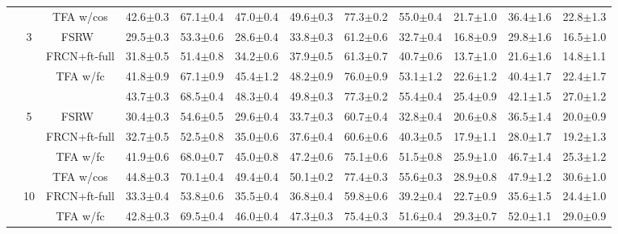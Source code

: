\documentclass{article}
\newcommand{\model}{TFA\xspace}
\begin{document}
\begin{table*}[!h]
{\begin{tabular}{c|c|c|ccc|ccc|ccc}
    & &\cellcolor{Gray} {\model w/cos} & \cellcolor{Gray}42.6$\pm$0.3 & \cellcolor{Gray} 67.1$\pm$0.4 & \cellcolor{Gray}47.0$\pm$0.4 &\cellcolor{Gray} 49.6$\pm$0.3 & \cellcolor{Gray}77.3$\pm$0.2 & \cellcolor{Gray}55.0$\pm$0.4 & \cellcolor{Gray}21.7$\pm$1.0 & \cellcolor{Gray}36.4$\pm$1.6 & \cellcolor{Gray}22.8$\pm$1.3  \\ \cmidrule{2-12}
    & \multirow{4}{*}{3} & FSRW~\cite{kang2019few} & 29.5$\pm$0.3&53.3$\pm$0.6&28.6$\pm$0.4&33.8$\pm$0.3&61.2$\pm$0.6&32.7$\pm$0.4&16.8$\pm$0.9&29.8$\pm$1.6&16.5$\pm$1.0 \\
    & & FRCN+ft-full & 31.8$\pm$0.5 & 51.4$\pm$0.8 & 34.2$\pm$0.6 & 37.9$\pm$0.5 & 61.3$\pm$0.7 & 40.7$\pm$0.6 & 13.7$\pm$1.0 & 21.6$\pm$1.6 & 14.8$\pm$1.1 \\
    & & {\model w/fc} & 41.8$\pm$0.9 & 67.1$\pm$0.9 & 45.4$\pm$1.2 & 48.2$\pm$0.9 & 76.0$\pm$0.9 & 53.1$\pm$1.2 & 22.6$\pm$1.2 & 40.4$\pm$1.7 & 22.4$\pm$1.7  \\
    & & \cellcolor{Gray}{\model w/cos} &\cellcolor{Gray} 43.7$\pm$0.3 &\cellcolor{Gray} 68.5$\pm$0.4 & \cellcolor{Gray}48.3$\pm$0.4 & \cellcolor{Gray}49.8$\pm$0.3 & \cellcolor{Gray}77.3$\pm$0.2 & \cellcolor{Gray}55.4$\pm$0.4 & \cellcolor{Gray}25.4$\pm$0.9 & \cellcolor{Gray}42.1$\pm$1.5 & \cellcolor{Gray}27.0$\pm$1.2  \\ \cmidrule{2-12}
    & \multirow{4}{*}{5} & FSRW~\cite{kang2019few} & 30.4$\pm$0.3&54.6$\pm$0.5&29.6$\pm$0.4&33.7$\pm$0.3&60.7$\pm$0.4&32.8$\pm$0.4&20.6$\pm$0.8&36.5$\pm$1.4&20.0$\pm$0.9 \\
    & & FRCN+ft-full & 32.7$\pm$0.5 & 52.5$\pm$0.8 & 35.0$\pm$0.6 & 37.6$\pm$0.4 & 60.6$\pm$0.6 & 40.3$\pm$0.5 & 17.9$\pm$1.1 & 28.0$\pm$1.7 & 19.2$\pm$1.3 \\
    & & {\model w/fc} & 41.9$\pm$0.6 & 68.0$\pm$0.7 & 45.0$\pm$0.8 & 47.2$\pm$0.6 & 75.1$\pm$0.6 & 51.5$\pm$0.8 & 25.9$\pm$1.0 & 46.7$\pm$1.4 & 25.3$\pm$1.2  \\
    & &\cellcolor{Gray} {\model w/cos} &\cellcolor{Gray} 44.8$\pm$0.3 & \cellcolor{Gray}70.1$\pm$0.4 &\cellcolor{Gray} 49.4$\pm$0.4 &\cellcolor{Gray} 50.1$\pm$0.2 &\cellcolor{Gray} 77.4$\pm$0.3 &\cellcolor{Gray} 55.6$\pm$0.3 &\cellcolor{Gray} 28.9$\pm$0.8 & \cellcolor{Gray}47.9$\pm$1.2 & \cellcolor{Gray}30.6$\pm$1.0  \\ \cmidrule{2-12}
    & \multirow{3}{*}{10} & FRCN+ft-full & 33.3$\pm$0.4 & 53.8$\pm$0.6 & 35.5$\pm$0.4 & 36.8$\pm$0.4 & 59.8$\pm$0.6 & 39.2$\pm$0.4 & 22.7$\pm$0.9 & 35.6$\pm$1.5 & 24.4$\pm$1.0 \\
    & & {\model w/fc} & 42.8$\pm$0.3 & 69.5$\pm$0.4 & 46.0$\pm$0.4 & 47.3$\pm$0.3 & 75.4$\pm$0.3 & 51.6$\pm$0.4 & 29.3$\pm$0.7 & 52.0$\pm$1.1 & 29.0$\pm$0.9  \\

\end{tabular}}
\end{table*}
\end{document}
